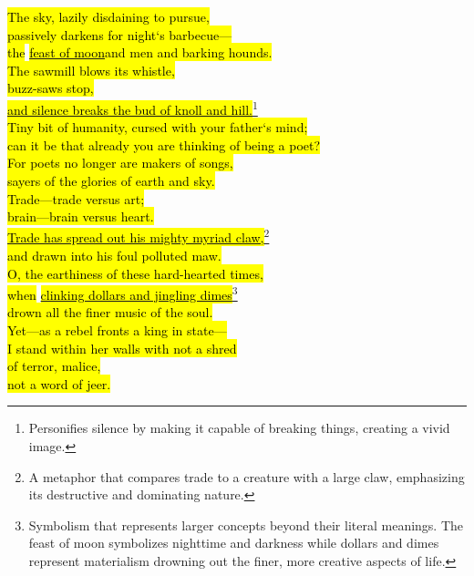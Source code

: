 \documentclass[stu]{apa7}
\begin{document}
\hl{The sky, lazily disdaining to pursue,} \\
\hl{passively darkens for night`s barbecue---} \\
\hl{the} \underline{\hl{feast of moon}}\hl{and men and barking hounds.} \\
\hl{The sawmill blows its whistle,} \\
\hl{buzz-saws stop,} \\
\underline{\hl{and silence breaks the bud of knoll and hill.}}\footnote{Personifies silence by making it capable of breaking things, creating a vivid image.} \\
\vspace{5mm}
\hl{Tiny bit of humanity, cursed with your father`s mind;} \\
\hl{can it be that already you are thinking of being a poet?} \\
\hl{For poets no longer are makers of songs,} \\
\hl{sayers of the glories of earth and sky.} \\
\vspace{5mm}
\hl{Trade---trade versus art;} \\
\hl{brain---brain versus heart.} \\
\underline{\hl{Trade has spread out his mighty myriad claw,}}\footnote{A metaphor that compares trade to a creature with a large claw, emphasizing its destructive and dominating nature.} \\
\hl{and drawn into his foul polluted maw.} \\
\vspace{5mm}
\hl{O, the earthiness of these hard-hearted times,} \\
\hl{when} \underline{\hl{clinking dollars and jingling dimes}}\footnote[3]{Symbolism that represents larger concepts beyond their literal meanings. The feast of moon symbolizes nighttime and darkness while dollars and dimes represent materialism drowning out the finer, more creative aspects of life.} \\
\hl{drown all the finer music of the soul.} \\
\vspace{5mm}
\hl{Yet---as a rebel fronts a king in state---} \\
\hl{I stand within her walls with not a shred} \\
\hl{of terror, malice,}  \\
\hl{not a word of jeer.} \\
\end{document}
